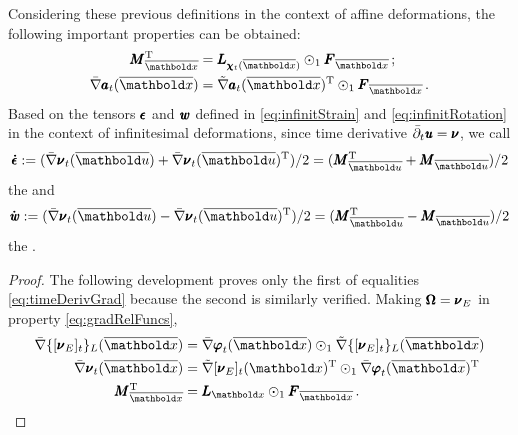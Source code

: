 Considering these previous definitions in the context of affine deformations, the following important properties can be obtained:
\begin{equation}\label{eq:timeDerivGrad}
\begin{aligned}
\tnr{M}_{\overline{\vto{x}}}^\text{T}&= \tnr{L}_{\tnr{\chi}_t(\overline{\vto{x}})}\odot_1\tnr{F}_{\overline{\vto{x}}}\,;\\
\fua{\bar{\nabla}\tnr{a}_t}{\overline{\vto{x}}}&=\fua{\tilde{\nabla}\tnr{a}_t}{\overline{\vto{x}}}^{\text{T}}\odot_1\tnr{F}_{\overline{\vto{x}}}\,.
\end{aligned} 
\end{equation} 
Based on the tensors $\pmb{\epsilon}$ and $\pmb{\mathit{w}}$ defined in \eqref{eq:infinitStrain} and \eqref{eq:infinitRotation} in the context of infinitesimal deformations, since time derivative $\bar{\partial}_t\pmb{\mathit{u}}=\pmb{\nu}$, we call  
\begin{equation}\label{eq:infinitStrain}
\tnr{\dot{\epsilon}}:=(\fua{\bar{\nabla}\tnr{\nu}_t}{\overline{\vto{u}}}+\fua{\bar{\nabla}\tnr{\nu}_t}{\overline{\vto{u}}}^{\text{T}})/2=(\tnr{M}_{\overline{\vto{u}}}^{\text{T}}+\tnr{M}_{\overline{\vto{u}}})/2
\end{equation}
the  and
\begin{equation}\label{eq:infinitSpin}
\tnr{\dot{\mathit{w}}}:=(\fua{\bar{\nabla}\tnr{\nu}_t}{\overline{\vto{u}}}-\fua{\bar{\nabla}\tnr{\nu}_t}{\overline{\vto{u}}}^{\text{T}})/2=(\tnr{M}_{\overline{\vto{u}}}^{\text{T}}-\tnr{M}_{\overline{\vto{u}}})/2
\end{equation}
the .


{\footnotesize
\begin{proof}
The following development proves only the first of equalities \eqref{eq:timeDerivGrad} because the second is similarly verified. Making $\pmb{\Omega}=\pmb{\nu}_E$ in property \eqref{eq:gradRelFuncs}, 
\begin{align*}
\bar{\nabla}\{[{\tnr{\nu}_E}]_{t}\}_L(\overline{\vto{x}})&=\bar{\nabla}{\tnr{\varphi}}_{t}(\overline{\vto{x}})\odot_1\tilde{\nabla}\{[{\tnr{\nu}_E}]_{t}\}_L(\overline{\vto{x}})\\
\bar{\nabla}{\tnr{\nu}}_{t}(\overline{\vto{x}})&=\tilde{\nabla}[\tnr{\nu}_E]_{t}({\vto{x}})^\text{T}\odot_1\bar{\nabla}{\tnr{\varphi}}_{t}(\overline{\vto{x}})^\text{T}\\
\tnr{M}_{\overline{\vto{x}}}^\text{T}&=\tnr{L}_{{\vto{x}}}\odot_1\tnr{F}_{\overline{\vto{x}}}\,.
\end{align*}
\end{proof}
}


